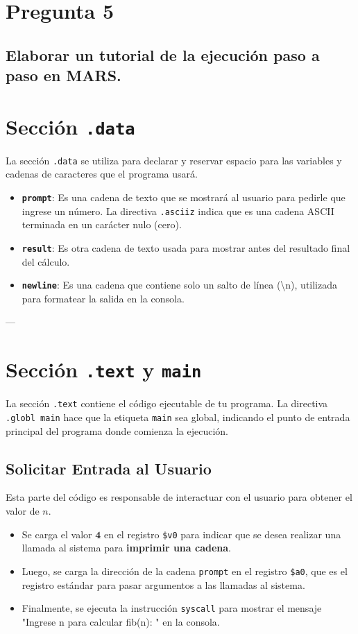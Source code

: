\documentclass{article}
\begin{document}
\section*{Pregunta 5}

\subsection*{Elaborar un tutorial de la ejecución paso a paso en MARS.}


\section{Sección \texttt{.data}}
La sección \texttt{.data} se utiliza para declarar y reservar espacio para las variables y cadenas de caracteres que el programa usará.

\begin{itemize}
    \item \textbf{\texttt{prompt}}: Es una cadena de texto que se mostrará al usuario para pedirle que ingrese un número. La directiva \texttt{.asciiz} indica que es una cadena ASCII terminada en un carácter nulo (cero).
    \item \textbf{\texttt{result}}: Es otra cadena de texto usada para mostrar antes del resultado final del cálculo.
    \item \textbf{\texttt{newline}}: Es una cadena que contiene solo un salto de línea (\textbackslash n), utilizada para formatear la salida en la consola.
\end{itemize}

---

\section{Sección \texttt{.text} y \texttt{main}}
La sección \texttt{.text} contiene el código ejecutable de tu programa. La directiva \texttt{.globl main} hace que la etiqueta \texttt{main} sea global, indicando el punto de entrada principal del programa donde comienza la ejecución.

\subsection*{Solicitar Entrada al Usuario}
Esta parte del código es responsable de interactuar con el usuario para obtener el valor de $n$.
\begin{itemize}
    \item Se carga el valor $\mathbf{4}$ en el registro \texttt{\$v0} para indicar que se desea realizar una llamada al sistema para \textbf{imprimir una cadena}.
    \item Luego, se carga la dirección de la cadena \texttt{prompt} en el registro \texttt{\$a0}, que es el registro estándar para pasar argumentos a las llamadas al sistema.
    \item Finalmente, se ejecuta la instrucción \texttt{syscall} para mostrar el mensaje "Ingrese n para calcular fib(n): " en la consola.
\end{itemize}
\end{document}

